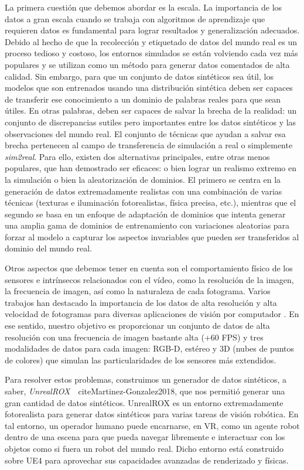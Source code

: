 La primera cuestión que debemos abordar es la escala. La importancia de los datos a gran escala cuando se trabaja con algoritmos de aprendizaje que requieren datos es fundamental para lograr resultados y generalización adecuados. Debido al hecho de que la recolección y etiquetado de datos del mundo real es un proceso tedioso y costoso, los entornos simulados se están volviendo cada vez más populares y se utilizan como un método para generar datos comentados de alta calidad. Sin embargo, para que un conjunto de datos sintéticos sea útil, los modelos que son entrenados usando una distribución sintética deben ser capaces de transferir ese conocimiento a un dominio de palabras reales para que sean útiles. En otras palabras, deben ser capaces de salvar la brecha de la realidad: un conjunto de discrepancias sutiles pero importantes entre los datos sintéticos y las observaciones del mundo real. El conjunto de técnicas que ayudan a salvar esa brecha pertenecen al campo de transferencia de simulación a real o simplemente \emph{sim2real}. Para ello, existen dos alternativas principales, entre otras menos populares, que han demostrado ser eficaces: o bien lograr un realismo extremo en la simulación o bien la aleatorización de dominios. El primero se centra en la generación de datos extremadamente realistas con una combinación de varias técnicas (texturas e iluminación fotorealistas, física precisa, etc.), mientras que el segundo se basa en un enfoque de adaptación de dominios que intenta generar una amplia gama de dominios de entrenamiento con variaciones aleatorias para forzar al modelo a capturar los aspectos invariables que pueden ser transferidos al dominio del mundo real. 

Otros aspectos que debemos tener en cuenta son el comportamiento físico de los sensores e intrínsecos relacionados con el vídeo, como la resolución de la imagen, la frecuencia de imagen, así como la naturaleza de cada fotograma. Varios trabajos han destacado la importancia de los datos de alta resolución y alta velocidad de fotogramas para diversas aplicaciones de visión por computador \cite{Handa2012}\cite{Held2016}. En ese sentido, nuestro objetivo es proporcionar un conjunto de datos de alta resolución con una frecuencia de imagen bastante alta (+60 FPS) y tres modalidades de datos para cada imagen: RGB-D, estéreo y 3D (nubes de puntos de colores) que simulan las particularidades de los sensores más extendidos.

Para resolver estos problemas, construimos un generador de datos sintéticos, a saber, \emph{UnrealROX}~~cite{Martinez-Gonzalez2018}, que nos permitió generar una gran cantidad de datos sintéticos. UnrealROX es un entorno extremadamente fotorealista para generar datos sintéticos para varias tareas de visión robótica. En tal entorno, un operador humano puede encarnarse, en \acl{VR}, como un agente robot dentro de una escena para que pueda navegar libremente e interactuar con los objetos como si fuera un robot del mundo real. Dicho entorno está construido sobre \ac{UE4} para aprovechar sus capacidades avanzadas de renderizado y físicas.

